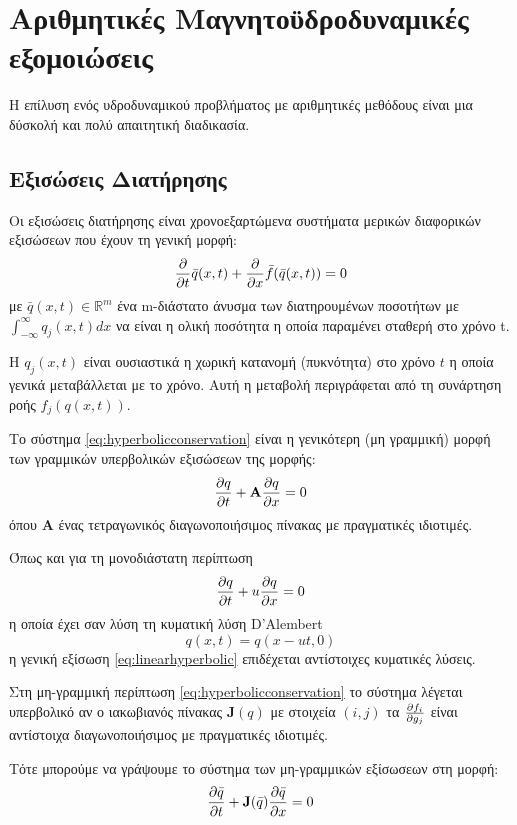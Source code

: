 \section{Αριθμητικές Μαγνητοϋδροδυναμικές εξομοιώσεις}
Η επίλυση ενός υδροδυναμικού προβλήματος με αριθμητικές μεθόδους είναι μια δύσκολή και πολύ απαιτητική διαδικασία. 

\subsection{Εξισώσεις Διατήρησης}
Οι εξισώσεις διατήρησης είναι χρονοεξαρτώμενα συστήματα μερικών διαφορικών εξισώσεων που έχουν τη γενική μορφή:
\begin{equation}
\label{eq:hyperbolicconservation}
\pdv{t} \bar{q}(x,t) + \pdv{x} \bar{f}(\bar{q}(x,t)) = 0 
\end{equation}
με $\bar{q}(x,t) \in \mathbb{R}^m$ ένα m-διάστατο άνυσμα των διατηρουμένων ποσοτήτων με  $\int_{-\infty}^{\infty} q_j (x,t) dx$ να είναι η ολική ποσότητα η οποία παραμένει σταθερή στο χρόνο t. 

Η $q_j(x,t)$ είναι ουσιαστικά η χωρική κατανομή (πυκνότητα) στο χρόνο $t$ η οποία γενικά μεταβάλλεται με το χρόνο.
Αυτή η μεταβολή περιγράφεται από τη συνάρτηση ροής $f_j(q(x,t))$. 
 
Το σύστημα \ref{eq:hyperbolicconservation} είναι η γενικότερη (μη γραμμική) μορφή των γραμμικών υπερβολικών εξισώσεων της μορφής:
\begin{equation}
\label{eq:linearhyperbolic}
\pdv{q}{t} +  \mathbf{A}\pdv{q}{x}  = 0 
\end{equation}
όπου $\mathbf{A}$ ένας τετραγωνικός διαγωνοποιήσιμος πίνακας με πραγματικές ιδιοτιμές.

Όπως και για τη μονοδιάστατη  περίπτωση 
\begin{equation}
\label{eq:simple_advection}
\pdv{q}{t} +  u\pdv{q}{x}  = 0 
\end{equation}
η οποία έχει σαν λύση τη κυματική λύση D'Alembert
\begin{equation}
q(x,t)=q(x-ut,0)
\end{equation}
η γενική εξίσωση \ref{eq:linearhyperbolic} επιδέχεται αντίστοιχες κυματικές λύσεις.

Στη μη-γραμμική περίπτωση \ref{eq:hyperbolicconservation} το σύστημα λέγεται υπερβολικό αν ο ιακωβιανός πίνακας $\mathbf{J}(q)$ με στοιχεία $(i,j)$ τα $\pdv{f_i}{g_j}$ είναι αντίστοιχα διαγωνοποιήσιμος με πραγματικές ιδιοτιμές.

Τότε μπορούμε να γράψουμε το σύστημα των μη-γραμμικών εξίσωσεων στη μορφή:
\begin{equation}
\pdv{\bar{q}}{t} + \mathbf{J}(\bar{q}) \pdv{\bar{q}}{x} = 0 
\end{equation}

